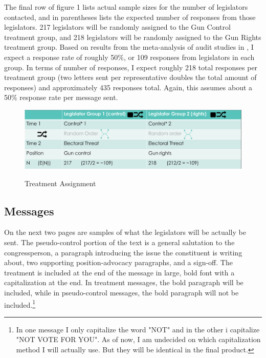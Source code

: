 \documentclass[12pt]{article}\usepackage[]{graphicx}\usepackage[]{color}
\begin{document}
The final row of figure 1 lists actual sample sizes for the number of legislators contacted, and in parentheses lists the expected number of responses from those legislators. 217 legislators will be randomly assigned to the Gun Control treatment group, and 218 legislators will be randomly assigned to the Gun Rights treatment group. Based on results from the meta-analysis of audit studies in \cite{Costa:2017aa}, I expect a response rate of roughly 50\%, or 109 responses from legislators in each group. In terms of number of responses, I expect roughly 218 total responses per treatment group (two letters sent per representative doubles the total amount of responses) and approximately 435 responses total. Again, this assumes about a 50\% response rate per message sent.\\

\begin{figure}[h!]
	\caption{Treatment Assignment}
	\includegraphics[width=\textwidth]{design_chart.png}\\
\end{figure}

\subsection{Messages}
On the next two pages are samples of what the legislators will be actually be sent. The pseudo-control portion of the text is a general salutation to the congressperson, a paragraph introducing the issue the constituent is writing about, two supporting position-advocacy paragraphs, and a sign-off. The treatment is included at the end of the message in large, bold font with a capitalization at the end. In treatment messages, the bold paragraph will be included, while in pseudo-control messages, the bold paragraph will not be included.\footnote{In one message I only capitalize the word "NOT" and in the other i capitalize "NOT VOTE FOR YOU". As of now, I am undecided on which capitalization method I will actually use. But they will be identical in the final product.}
\end{document}
